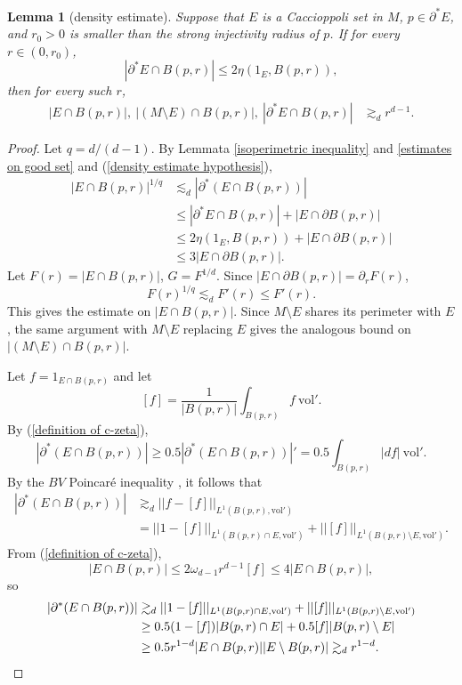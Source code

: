 \documentclass[reqno,12pt,letterpaper]{amsart}
\newcommand{\vol}{\mathrm{vol}}
\newtheorem{lemma}[theorem]{Lemma}
\theoremstyle{definition}
\numberwithin{equation}{section}
\begin{document}
\begin{lemma}[density estimate]\label{uniform density estimate}
Suppose that $E$ is a Caccioppoli set in $M$, $p \in \partial^* E$, and $r_0 > 0$ is smaller than the strong injectivity radius of $p$.
If for every $r \in (0, r_0)$,
\begin{equation}\label{density estimate hypothesis}
|\partial^* E \cap B(p, r)| \leq 2\eta(1_E, B(p, r)),
\end{equation}
then for every such $r$,
\begin{align*}|E \cap B(p, r)|, ~|(M \setminus E) \cap B(p, r)|, ~|\partial^* E \cap B(p, r)| &\gtrsim_d r^{d - 1}.\end{align*}
\end{lemma}
\begin{proof}
Let $q = d/(d-1)$. By Lemmata \ref{isoperimetric inequality} and \ref{estimates on good set} and (\ref{density estimate hypothesis}),
\begin{align*}
|E \cap B(p, r)|^{1/q} &\lesssim_d |\partial^*(E \cap B(p, r))| \\
&\leq |\partial^* E \cap B(p, r)| + |E \cap \partial B(p, r)|\\
&\leq 2\eta(1_E, B(p, r)) +  |E \cap \partial B(p, r)|\\
&\leq 3 |E \cap \partial B(p, r)|.
\end{align*}
Let $F(r) = |E \cap B(p, r)|$, $G = F^{1/d}$.
Since $|E \cap \partial B(p, r)| = \partial_r F(r)$,
$$F(r)^{1/q} \lesssim_d F'(r) \leq F'(r).$$
This gives the estimate on $|E \cap B(p, r)|$.
Since $M \setminus E$ shares its perimeter with $E$, the same argument with $M \setminus E$ replacing $E$ gives the analogous bound on $|(M \setminus E) \cap B(p, r)|$.

Let $f = 1_{E \cap B(p, r)}$ and let
$$[f] = \frac{1}{|B(p, r)|} \int_{B(p, r)} f ~\vol'.$$
By (\ref{definition of c-zeta}),
$$|\partial^* (E \cap B(p, r))| \geq 0.5 |\partial^* (E \cap B(p, r))|' = 0.5 \int_{B(p, r)} |df| ~\vol'.$$
By the $BV$ Poincar\'e inequality \cite[\S5.6.1]{evans1991measure}, it follows that
\begin{align*}
|\partial^* (E \cap B(p, r))| &\gtrsim_d ||f - [f]||_{L^1(B(p, r), \vol')} \\
&= ||1 - [f]||_{L^1(B(p, r) \cap E, \vol')} + ||[f]||_{L^1(B(p, r) \setminus E, \vol')}.
\end{align*}
From (\ref{definition of c-zeta}),
$$|E \cap B(p, r)| \leq 2\omega_{d - 1} r^{d - 1} [f] \leq 4|E \cap B(p, r)|,$$
so
\begin{align*}
|\partial^* (E \cap B(p, r))| &\gtrsim_d ||1 - [f]||_{L^1(B(p, r) \cap E, \vol')} + ||[f]||_{L^1(B(p, r) \setminus E, \vol')}\\
&\geq 0.5 (1 - [f]) |B(p, r) \cap E| + 0.5 [f] |B(p, r) \setminus E|\\
&\geq 0.5 r^{1-d}|E \cap B(p, r)||E \setminus B(p, r)| \gtrsim_d r^{1 - d}. \qedhere
\end{align*}
\end{proof}
\end{document}
